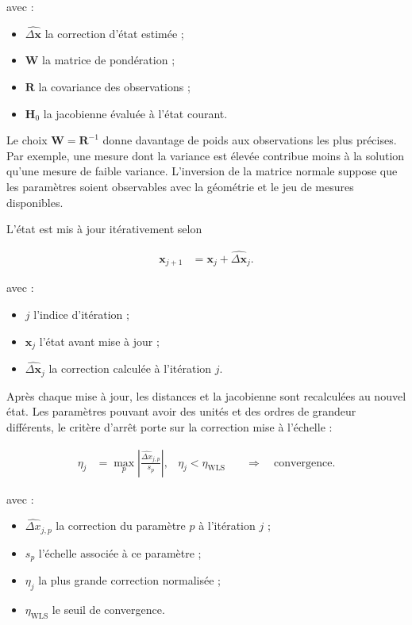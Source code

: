 avec :

\begin{itemize}
    \item $\widehat{\Delta\mathbf x}$ la correction d'état estimée ;
    \item $\mathbf W$ la matrice de pondération ;
    \item $\mathbf R$ la covariance des observations ;
    \item $\mathbf H_0$ la jacobienne évaluée à l'état courant.
\end{itemize}

Le choix $\mathbf W=\mathbf R^{-1}$ donne davantage de poids aux observations
les plus précises. Par exemple, une mesure dont la variance est élevée contribue
moins à la solution qu'une mesure de faible variance. L'inversion de la matrice
normale suppose que les paramètres soient observables avec la géométrie et le
jeu de mesures disponibles.

L'état est mis à jour itérativement selon

\begin{align}
\mathbf x_{j+1}
&=
\mathbf x_j+\widehat{\Delta\mathbf x}_j.
\label{ann:eq:wls_iteration}
\end{align}

avec :

\begin{itemize}
    \item $j$ l'indice d'itération ;
    \item $\mathbf x_j$ l'état avant mise à jour ;
    \item $\widehat{\Delta\mathbf x}_j$ la correction calculée à l'itération
    $j$.
\end{itemize}

Après chaque mise à jour, les distances et la jacobienne sont recalculées au
nouvel état. Les paramètres pouvant avoir des unités et des ordres de grandeur
différents, le critère d'arrêt porte sur la correction mise à l'échelle :

\begin{align}
\eta_j
&=
\max_p\left|
\frac{\widehat{\Delta x}_{j,p}}{s_p}
\right|,
&
\eta_j<\eta_{\mathrm{WLS}}
&\quad\Longrightarrow\quad
\text{convergence}.
\label{ann:eq:wls_stopping_criterion}
\end{align}

avec :

\begin{itemize}
    \item $\widehat{\Delta x}_{j,p}$ la correction du paramètre $p$ à
    l'itération $j$ ;
    \item $s_p$ l'échelle associée à ce paramètre ;
    \item $\eta_j$ la plus grande correction normalisée ;
    \item $\eta_{\mathrm{WLS}}$ le seuil de convergence.
\end{itemize}

